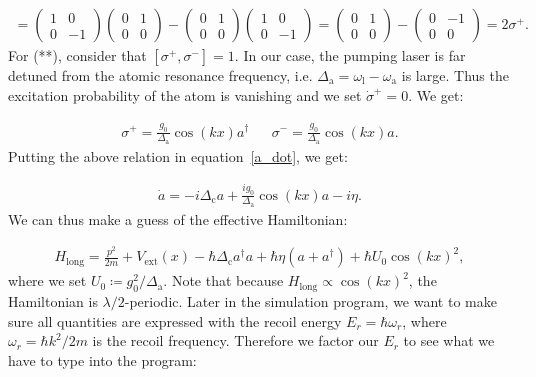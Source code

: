 \begin{align}
[\sigma_z, \sigma^+] = \begin{pmatrix}1 & 0 \\ 0 & -1\end{pmatrix} \begin{pmatrix}0 & 1 \\ 0 & 0\end{pmatrix} - \begin{pmatrix}0 & 1 \\ 0 & 0\end{pmatrix} \begin{pmatrix}1 & 0 \\ 0 & -1\end{pmatrix} = \begin{pmatrix}0 & 1 \\ 0 & 0\end{pmatrix} - \begin{pmatrix}0 & -1 \\ 0 & 0\end{pmatrix} = 2\sigma^+.
\end{align}For (**), consider that $[\sigma^+, \sigma^-] = 1$. In our case, the pumping laser is far detuned from the atomic resonance frequency, i.e. $\Delta_\text{a} = \omega_\text{l} - \omega_\text{a}$ is large. Thus the excitation probability of the atom is vanishing and we set $\dot{\sigma}^+ = 0$. We get:

\begin{align}
\sigma^+ = \frac{g_0 }{\Delta_\text{a}} \cos(kx) a^\dagger && \sigma^- = \frac{g_0 }{\Delta_\text{a}} \cos(kx) a.
\end{align}Putting the above relation in equation~\ref{a_dot}, we get:

\begin{align}
\dot{a} = -i \Delta_\text{c} a + \frac{i g_0}{\Delta_\text{a}}  \cos(kx) a - i \eta.
\end{align}We can thus make a guess of the effective Hamiltonian:

\begin{align}
H_\text{long} = \frac{p^2}{2m} + V_\text{ext}(x) - \hbar \Delta_\text{c} a^\dagger a + \hbar \eta (a + a^\dagger) + \hbar U_0 \cos(kx)^2,
\end{align}where we set $U_0 \coloneqq g_0^2 / \Delta_\text{a}$. Note that because $H_\text{long} \propto \cos(kx)^2$, the Hamiltonian is $\lambda / 2$-periodic. Later in the simulation program, we want to make sure all quantities are expressed with the recoil energy $E_r = \hbar \omega_r$, where $\omega_r = \hbar k^2 / 2m$ is the recoil frequency. Therefore we factor our $E_r$ to see what we have to type into the program:

